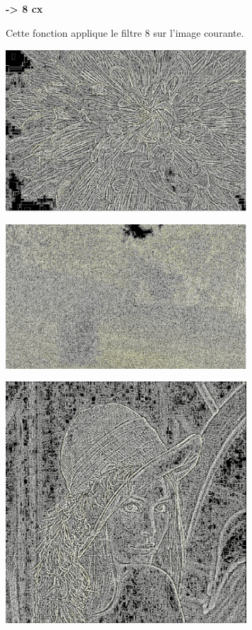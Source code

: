 \documentclass{article}
\begin{document}
\textbf{-> 8 cx}

Cette fonction applique le filtre 8 sur l'image courante.

\begin{center} 
    \includegraphics[width=9cm]{../Image_fonctions/Multicolor/Laplacien8.PNG}
\end{center}
\begin{center} 
    \includegraphics[width=9cm]{../Image_fonctions/Cat/Laplacien8.PNG}
\end{center}
\begin{center} 
    \includegraphics[width=9cm]{../Image_fonctions/Lenna/Laplacien8.PNG}
\end{center}
\end{document}
